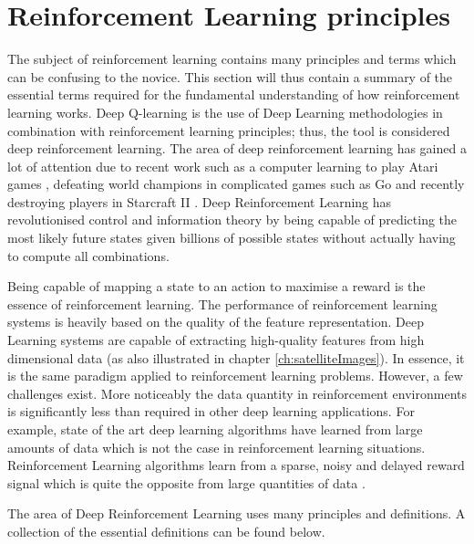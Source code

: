 \section{Reinforcement Learning principles}\label{sec:reinforcement_learning_principles}
The subject of reinforcement learning contains many principles and terms which can be confusing to the novice. This section will thus contain a summary of the essential terms required for the fundamental understanding of how reinforcement learning works. Deep Q-learning is the use of Deep Learning methodologies in combination with reinforcement learning principles; thus, the tool is considered deep reinforcement learning. The area of deep reinforcement learning has gained a lot of attention due to recent work such as a computer learning to play Atari games \cite{MnihPlayingLearning}, defeating world champions in complicated games such as Go \cite{Silver2016MasteringSearch} and recently destroying players in Starcraft II \cite{Vinyals2019GrandmasterLearning}. Deep Reinforcement Learning has revolutionised control and information theory by being capable of predicting the most likely future states given billions of possible states without actually having to compute all combinations.

Being capable of mapping a state to an action to maximise a reward is the essence of reinforcement learning. The performance of reinforcement learning systems is heavily based on the quality of the feature representation. Deep Learning systems are capable of extracting high-quality features from high dimensional data (as also illustrated in chapter \ref{ch:satelliteImages}). In essence, it is the same paradigm applied to reinforcement learning problems. However, a few challenges exist. More noticeably the data quantity in reinforcement environments is significantly less than required in other deep learning applications. For example, state of the art deep learning algorithms have learned from large amounts of data which is not the case in reinforcement learning situations. Reinforcement Learning algorithms learn from a sparse, noisy and delayed reward signal which is quite the opposite from large quantities of data \cite{Sutton2017ReinforcementSecond}. 

The area of Deep Reinforcement Learning uses many principles and definitions. A collection of the essential definitions can be found below.


